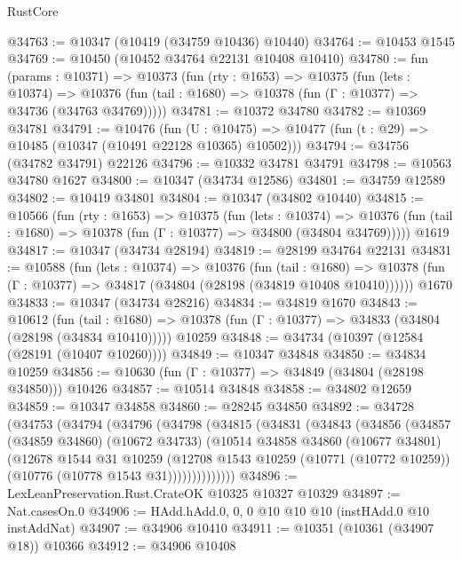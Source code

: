 \begin{lexlean}{RustCore}
\begin{coremodule}
@34763 := @10347 (@10419 (@34759 @10436) @10440)
@34764 := @10453 @1545
@34769 := @10450 (@10452 @34764 @22131 @10408 @10410)
@34780 := fun (params : @10371) =>
  @10373
    (fun (rty : @1653) =>
    @10375
      (fun (lets : @10374) =>
      @10376 (fun (tail : @1680) => @10378 (fun (Γ : @10377) => @34736 (@34763 @34769)))))
@34781 := @10372 @34780
@34782 := @10369 @34781
@34791 := @10476
    (fun (U : @10475) => @10477 (fun (t : @29) => @10485 (@10347 (@10491 @22128 @10365) @10502)))
@34794 := @34756 (@34782 @34791) @22126
@34796 := @10332 @34781 @34791
@34798 := @10563 @34780 @1627
@34800 := @10347 (@34734 @12586)
@34801 := @34759 @12589
@34802 := @10419 @34801
@34804 := @10347 (@34802 @10440)
@34815 := @10566
    (fun (rty : @1653) =>
    @10375
      (fun (lets : @10374) =>
      @10376 (fun (tail : @1680) => @10378 (fun (Γ : @10377) => @34800 (@34804 @34769)))))
    @1619
@34817 := @10347 (@34734 @28194)
@34819 := @28199 @34764 @22131
@34831 := @10588
    (fun (lets : @10374) =>
    @10376
      (fun (tail : @1680) =>
      @10378 (fun (Γ : @10377) => @34817 (@34804 (@28198 (@34819 @10408 @10410))))))
    @1670
@34833 := @10347 (@34734 @28216)
@34834 := @34819 @1670
@34843 := @10612
    (fun (tail : @1680) => @10378 (fun (Γ : @10377) => @34833 (@34804 (@28198 (@34834 @10410)))))
    @10259
@34848 := @34734 (@10397 (@12584 (@28191 (@10407 @10260))))
@34849 := @10347 @34848
@34850 := @34834 @10259
@34856 := @10630 (fun (Γ : @10377) => @34849 (@34804 (@28198 @34850))) @10426
@34857 := @10514 @34848
@34858 := @34802 @12659
@34859 := @10347 @34858
@34860 := @28245 @34850
@34892 := @34728
    (@34753
      (@34794
        (@34796
          (@34798
            (@34815
              (@34831
                (@34843
                  (@34856
                    (@34857
                      (@34859 @34860)
                      (@10672 @34733)
                      (@10514
                        @34858
                        @34860
                        (@10677 @34801)
                        (@12678
                          @1544
                          @31
                          @10259
                          (@12708
                            @1543
                            @10259
                            (@10771 (@10772 @10259))
                            (@10776 (@10778 @1543 @31))))))))))))))
@34896 := LexLeanPreservation.Rust.CrateOK @10325 @10327 @10329
@34897 := Nat.casesOn.{0}
@34906 := HAdd.hAdd.{0, 0, 0} @10 @10 @10 (instHAdd.{0} @10 instAddNat)
@34907 := @34906 @10410
@34911 := @10351 (@10361 (@34907 @18)) @10366
@34912 := @34906 @10408

\end{coremodule}
\end{lexlean}
